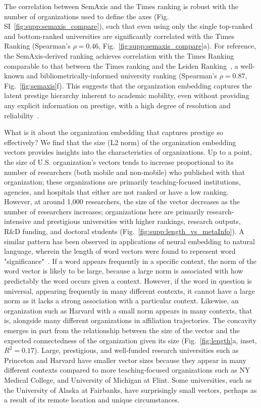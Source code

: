 \documentclass[12pt]{article} %
\begin{document}
The correlation between SemAxis and the Times ranking is robust with the number of organizations used to define the axes (Fig. SI~\ref{fig:supp:semaxis_compare}), such that even using only the single top-ranked and bottom-ranked universities are significantly correlated with the Times Ranking (Spearman's $\rho = 0.46$, Fig.~\ref{fig:supp:semaxis_compare}a).
For reference, the SemAxis-derived ranking achieves correlation with the Times Ranking comparable to that between the Times ranking and the Leiden Ranking~\autocite{waltman2012leidenrankings}, a well-known and bibliometrically-informed university ranking (Spearman's $\rho = 0.87$, Fig.~\ref{fig:semaxis}f).
This suggests that the organization embedding captures the latent prestige hierarchy inherent to academic mobility, even without providing any explicit information on prestige, with a high degree of resolution and reliability~\autocite{deville2014career, clauset2015hierarchy}. 

What is it about the organization embedding that captures prestige so effectively?
We find that the size (L2 norm) of the organization embedding vectors provides insights into the characteristics of organizations. 
Up to a point, the size of U.S. organization's vectors tends to increase proportional to its number of researchers (both mobile and non-mobile) who published with that organization;
these organizations are primarily teaching-focused institutions, agencies, and hospitals that either are not ranked or have a low ranking. 
However, at around 1,000 researchers, the size of the vector decreases as the number of researchers increases;
organizations here are primarily research-intensive and prestigious universities with higher rankings, research outputs, R\&D funding, and doctoral students (Fig.~\ref{fig:supp:length_vs_metaInfo}).
A similar pattern has been observed in applications of neural embedding to natural language, wherein the length of word vectors were found to represent word "significance"~\autocite{schakel2015measuring}.
If a word appears frequently in a specific context, the norm of the word vector is likely to be large, because a large norm is associated with how predictably the word occurs given a context.
However, if the word in question is universal, appearing frequently in many different contexts, it cannot have a large norm as it lacks a strong association with a particular context. 
Likewise, an organization such as Harvard with a small norm appears in many contexts, that is, alongside many different organizations in affiliation trajectories. 
The concavity emerges in part from the relationship between the size of the vector and the expected connectedness of the organization given its size (Fig.~\ref{fig:length}a, inset, $R^{2} = 0.17$).
Large, prestigious, and well-funded research universities such as Princeton and Harvard have smaller vector sizes because they appear in many different contexts compared to more teaching-focused organizations such as NY Medical College, and University of Michigan at Flint. 
Some universities, such as the University of Alaska at Fairbanks, have surprisingly small vectors, perhaps as a result of its remote location and unique circumstances. 
\end{document}
